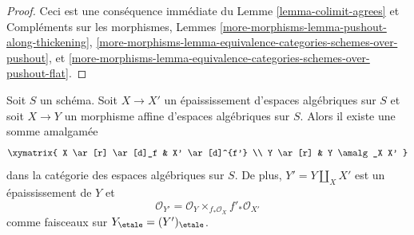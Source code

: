 \begin{proof}
Ceci est une conséquence immédiate du Lemme \ref{lemma-colimit-agrees} et
Compléments sur les morphismes, Lemmes
\ref{more-morphisms-lemma-pushout-along-thickening},
\ref{more-morphisms-lemma-equivalence-categories-schemes-over-pushout}, et
\ref{more-morphisms-lemma-equivalence-categories-schemes-over-pushout-flat}.
\end{proof}

\begin{lemma}
\label{lemma-pushout-along-thickening}
Soit $S$ un schéma. Soit $X \to X'$ un épaississement d'espaces algébriques sur $S$ et soit $X \to Y$ un morphisme affine d'espaces algébriques sur $S$.
Alors il existe une somme amalgamée
$$
\xymatrix{
X \ar[r] \ar[d]_f
&
X' \ar[d]^{f'}
\\
Y \ar[r]
&
Y \amalg_X X'
}
$$
dans la catégorie des espaces algébriques sur $S$. De plus, $Y' = Y \amalg_X X'$
est un épaississement de $Y$ et
$$
\mathcal{O}_{Y'} = \mathcal{O}_Y \times_{f_*\mathcal{O}_X} f'_*\mathcal{O}_{X'}
$$
comme faisceaux sur $Y_\etale = (Y')_\etale$.
\end{lemma}

